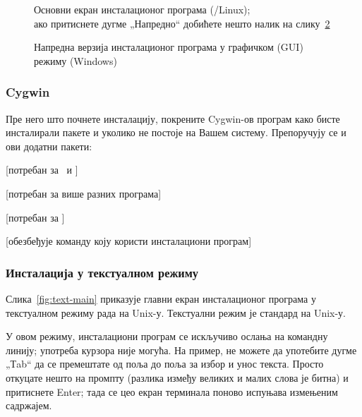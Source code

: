 \documentclass{article}
\begin{document}
\begin{figure}[tb]
\caption{Основни екран инсталационог програма (\GNU/Linux);\\ ако притиснете
  дугме „Напредно“ добићете нешто налик на 
  слику~\ref{fig:advanced-lnx}}\label{fig:wizard-w32}
\end{figure}

\begin{figure}[tb]
  \caption{Напредна верзија инсталационог програма у графичком (GUI) режиму 
  (Windows)}\label{fig:advanced-lnx}
\end{figure}


\subsubsection{Cygwin}
\label{sec:cygwin}

Пре него што почнете инсталацију, покрените Cygwin-ов програм
 како бисте инсталирали пакете  и
 уколико не постоје на Вашем систему. Препоручују се и
ови додатни пакети:
\begin{itemize*}
\item {} [потребан за \XeTeX\ и \LuaTeX]
\item {} [потребан за више разних програма]
\item {} [потребан за ]
\item {} [обезбеђује команду  коју
  користи инсталациони програм]
\end{itemize*}


\subsubsection{Инсталација у текстуалном режиму}

Слика~\ref{fig:text-main} приказује главни екран инсталационог
програма у текстуалном режиму рада на Unix-у. Текстуални режим је
стандард на Unix-у.

У овом режиму, инсталациони програм се искључиво ослања на командну
линију; употреба курзора није могућа. На пример, не можете да
употебите дугме „Тab“ да се премештате од поља до поља за избор и
унос текста. Просто откуцате нешто на промпту (разлика између великих
и малих слова је битна) и притиснете Enter; тада се цео екран
терминала поново испуњава измењеним садржајем.
\end{document}
